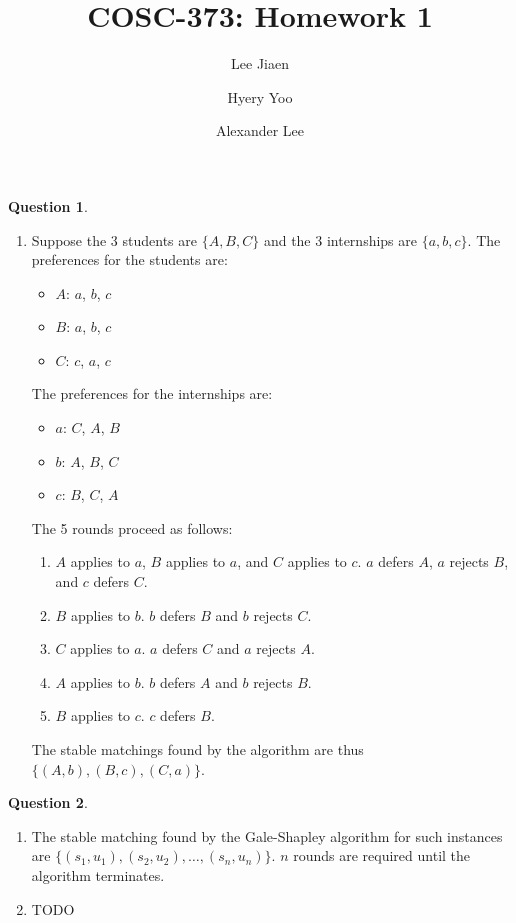 \documentclass{amsart}
\title{COSC-373: Homework 1}
\author{Lee Jiaen}
\author{Hyery Yoo}
\author{Alexander Lee}
\theoremstyle{definition}
\newtheorem{question}{Question}
\begin{document}
\maketitle

\begin{question}
  \begin{enumerate}[label={(\alph*)}]
    \item Suppose the 3 students are $\{A, B, C\}$ and the 3 internships are
      $\{a, b, c\}$. The preferences for the students are:
      \begin{itemize}
        \item $A$: $a$, $b$, $c$
        \item $B$: $a$, $b$, $c$
        \item $C$: $c$, $a$, $c$
      \end{itemize}
      The preferences for the internships are:
      \begin{itemize}
        \item $a$: $C$, $A$, $B$
        \item $b$: $A$, $B$, $C$
        \item $c$: $B$, $C$, $A$
      \end{itemize}
      The 5 rounds proceed as follows:
      \begin{enumerate}[label={(\arabic*)}]
        \item $A$ applies to $a$, $B$ applies to $a$, and $C$ applies to $c$.
          $a$ defers $A$, $a$ rejects $B$, and $c$ defers $C$.
        \item $B$ applies to $b$. $b$ defers $B$ and $b$ rejects $C$.
        \item $C$ applies to $a$. $a$ defers $C$ and $a$ rejects $A$.
        \item $A$ applies to $b$. $b$ defers $A$ and $b$ rejects $B$.
        \item $B$ applies to $c$. $c$ defers $B$.
      \end{enumerate}
      The stable matchings found by the algorithm are thus $\{(A, b), (B, c),
      (C, a)\}$.
  \end{enumerate}
\end{question}

\begin{question}
  \begin{enumerate}[label={(\alph*)}]
    \item The stable matching found by the Gale-Shapley algorithm for such
      instances are $\{(s_1, u_1), (s_2, u_2), \ldots, (s_n, u_n)\}$. $n$ rounds
      are required until the algorithm terminates.
    \item TODO
  \end{enumerate}
\end{question}
\end{document}

